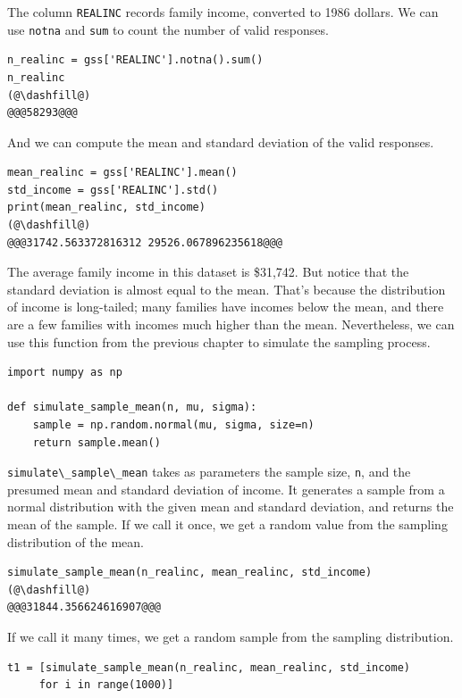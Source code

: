 The column \passthrough{\lstinline!REALINC!} records family income,
converted to 1986 dollars. We can use \passthrough{\lstinline!notna!}
and \passthrough{\lstinline!sum!} to count the number of valid
responses.

\begin{lstlisting}[]
n_realinc = gss['REALINC'].notna().sum()
n_realinc
(@\dashfill@)
@@@58293@@@
\end{lstlisting}

And we can compute the mean and standard deviation of the valid
responses.

\begin{lstlisting}[]
mean_realinc = gss['REALINC'].mean()
std_income = gss['REALINC'].std()
print(mean_realinc, std_income)
(@\dashfill@)
@@@31742.563372816312 29526.067896235618@@@
\end{lstlisting}

The average family income in this dataset is \$31,742. But notice that
the standard deviation is almost equal to the mean. That's because the
distribution of income is long-tailed; many families have incomes below
the mean, and there are a few families with incomes much higher than the
mean. Nevertheless, we can use this function from the previous chapter
to simulate the sampling process.

\begin{lstlisting}[]
import numpy as np

def simulate_sample_mean(n, mu, sigma):
    sample = np.random.normal(mu, sigma, size=n)
    return sample.mean()
\end{lstlisting}

\passthrough{\lstinline!simulate\_sample\_mean!} takes as parameters the
sample size, \passthrough{\lstinline!n!}, and the presumed mean and
standard deviation of income. It generates a sample from a normal
distribution with the given mean and standard deviation, and returns the
mean of the sample. If we call it once, we get a random value from the
sampling distribution of the mean.

\begin{lstlisting}[]
simulate_sample_mean(n_realinc, mean_realinc, std_income)
(@\dashfill@)
@@@31844.356624616907@@@
\end{lstlisting}

If we call it many times, we get a random sample from the sampling
distribution.

\begin{lstlisting}[]
t1 = [simulate_sample_mean(n_realinc, mean_realinc, std_income)
     for i in range(1000)]
\end{lstlisting}

